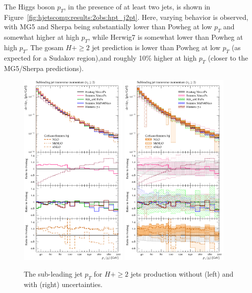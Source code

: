 The Higgs boson $p_T$, in the presence of at least two jets, is shown
in Figure~\ref{fig:hjetscomp:results:2obs:hpt_j2pt}. Here, varying
behavior is observed, with MG5 and Sherpa being substantially lower
than Powheg at low $p_T$ and somewhat higher at high $p_T$, while
Herwig7 is somewhat lower than Powheg at high $p_T$. The gosam
$H+\ge2$ jet prediction is lower than Powheg at low $p_T$ (as expected
for a Sudakov region),and roughly 10\% higher at high $p_T$ (closer to
the MG5/Sherpa predictions).

\begin{figure}[t!]
  \centering
  \includegraphics[width=0.47\textwidth]{figures/hjetscomp_u_jet2_pT_incl.pdf}
  \hfill
  \includegraphics[width=0.47\textwidth]{figures/hjetscomp_jet2_pT_incl.pdf}
  \caption{
    The sub-leading jet $p_T$ for $H+\ge2$ jets production without
    (left) and with (right) uncertainties.
    \label{fig:hjetscomp:results:2obs:jet2_pt}
  }
\end{figure}

